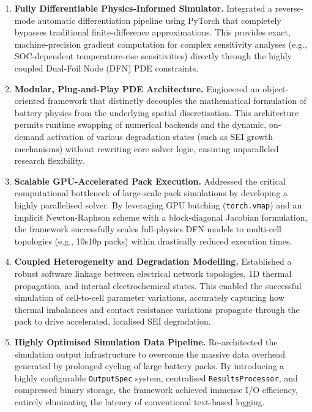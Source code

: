 \begin{enumerate}
  \item \textbf{Fully Differentiable Physics-Informed Simulator.} Integrated a reverse-mode automatic differentiation pipeline using PyTorch that completely bypasses traditional finite-difference approximations. This provides exact, machine-precision gradient computation for complex sensitivity analyses (e.g., SOC-dependent temperature-rise sensitivities) directly through the highly coupled Dual-Foil Node (DFN) PDE constraints.

  \item \textbf{Modular, Plug-and-Play PDE Architecture.} Engineered an object-oriented framework that distinctly decouples the mathematical formulation of battery physics from the underlying spatial discretisation. This architecture permits runtime swapping of numerical backends and the dynamic, on-demand activation of various degradation states (such as SEI growth mechanisms) without rewriting core solver logic, ensuring unparalleled research flexibility.

  \item \textbf{Scalable GPU-Accelerated Pack Execution.} Addressed the critical computational bottleneck of large-scale pack simulations by developing a highly parallelised solver. By leveraging GPU batching (\texttt{torch.vmap}) and an implicit Newton-Raphson scheme with a block-diagonal Jacobian formulation, the framework successfully scales full-physics DFN models to multi-cell topologies (e.g., 10s10p packs) within drastically reduced execution times.

  \item \textbf{Coupled Heterogeneity and Degradation Modelling.} Established a robust software linkage between electrical network topologies, 1D thermal propagation, and internal electrochemical states. This enabled the successful simulation of cell-to-cell parameter variations, accurately capturing how thermal imbalances and contact resistance variations propagate through the pack to drive accelerated, localised SEI degradation.

  \item \textbf{Highly Optimised Simulation Data Pipeline.} Re-architected the simulation output infrastructure to overcome the massive data overhead generated by prolonged cycling of large battery packs. By introducing a highly configurable \texttt{OutputSpec} system, centralised \texttt{ResultsProcessor}, and compressed binary storage, the framework achieved immense I/O efficiency, entirely eliminating the latency of conventional text-based logging.
\end{enumerate}

